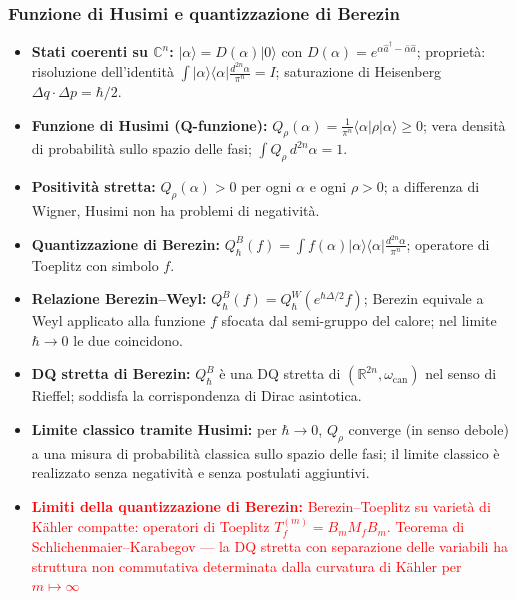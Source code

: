 \documentclass[12pt, a4paper]{article}
\begin{document}
	\subsubsection{Funzione di Husimi e quantizzazione di Berezin}
	\begin{itemize}
		\item \textbf{Stati coerenti su $\mathbb{C}^n$:} $|\alpha\rangle = D(\alpha)|0\rangle$ con $D(\alpha) = e^{\alpha\hat{a}^\dagger - \bar\alpha\hat{a}}$; proprietà: risoluzione dell'identità $\int|\alpha\rangle\langle\alpha|\frac{d^{2n}\alpha}{\pi^n} = I$; saturazione di Heisenberg $\Delta q \cdot \Delta p = \hbar/2$.
		\item \textbf{Funzione di Husimi (Q-funzione):} $Q_\rho(\alpha) = \frac{1}{\pi^n}\langle\alpha|\rho|\alpha\rangle \geq 0$; vera densità di probabilità sullo spazio delle fasi; $\int Q_\rho\,d^{2n}\alpha = 1$.
		\item \textbf{Positività stretta:} $Q_\rho(\alpha) > 0$ per ogni $\alpha$ e ogni $\rho > 0$; a differenza di Wigner, Husimi non ha problemi di negatività.
		\item \textbf{Quantizzazione di Berezin:} $Q^B_\hbar(f) = \int f(\alpha)|\alpha\rangle\langle\alpha|\frac{d^{2n}\alpha}{\pi^n}$; operatore di Toeplitz con simbolo $f$.
		\item \textbf{Relazione Berezin--Weyl:} $Q^B_\hbar(f) = Q^W_\hbar(e^{\hbar\Delta/2}f)$; Berezin equivale a Weyl applicato alla funzione $f$ sfocata dal semi-gruppo del calore; nel limite $\hbar\to 0$ le due coincidono.
		\item \textbf{DQ stretta di Berezin:} $Q^B_\hbar$ è una DQ stretta di $(\mathbb{R}^{2n},\omega_{\text{can}})$ nel senso di Rieffel; soddisfa la corrispondenza di Dirac asintotica.
		\item \textbf{Limite classico tramite Husimi:} per $\hbar\to 0$, $Q_\rho$ converge (in senso debole) a una misura di probabilità classica sullo spazio delle fasi; il limite classico è realizzato senza negatività e senza postulati aggiuntivi.
		\item \textcolor{red}{\textbf{Limiti della quantizzazione di Berezin:} Berezin–Toeplitz su varietà di Kähler compatte: operatori di Toeplitz $T_f^{(m)} = B_m M_f B_m$. Teorema di Schlichenmaier–Karabegov — la DQ stretta con separazione delle variabili ha struttura non commutativa determinata dalla curvatura di Kähler per $m \mapsto \infty$}
	\end{itemize}
	
	\newpage
\end{document}
